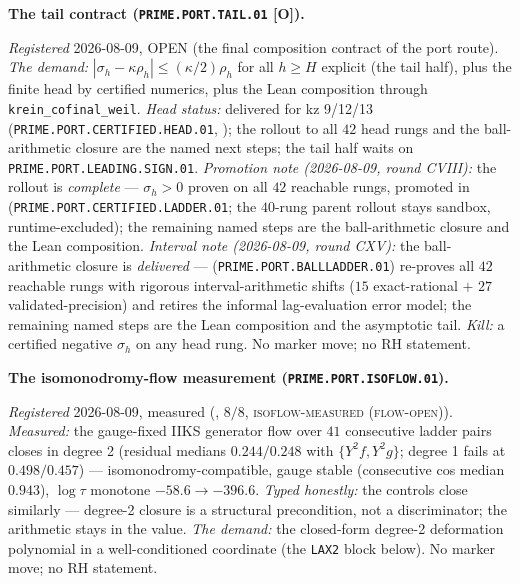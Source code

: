 \par\smallskip\noindent\textbf{The tail contract
(\texttt{PRIME.PORT.\allowbreak TAIL.01} [O]).}
{\sloppy
\emph{Registered} 2026-08-09, OPEN (the final composition
contract of the port route).  \emph{The demand:} $|\sigma_h -
\kappa\rho_h| \le (\kappa/2)\rho_h$ for all $h \ge H$ explicit
(the tail half), plus the finite head by certified numerics,
plus the Lean composition through
\texttt{krein\_cofinal\_weil}.  \emph{Head status:} delivered
for kz 9/12/13 (\texttt{PRIME.PORT.CERTIFIED.HEAD.01},
); the rollout to all
$42$ head rungs and the ball-arithmetic closure are the named
next steps; the tail half waits on
\texttt{PRIME.PORT.LEADING.SIGN.01}.  \emph{Promotion note
(2026-08-09, round CVIII):} the rollout is \emph{complete} ---
$\sigma_h > 0$ proven on all $42$ reachable rungs, promoted in
(\texttt{PRIME.PORT.CERTIFIED.LADDER.01}; the $40$-rung parent
rollout stays sandbox, runtime-excluded); the remaining named
steps are the ball-arithmetic closure and the Lean composition.
\emph{Interval note (2026-08-09, round CXV):} the
ball-arithmetic closure is \emph{delivered} ---
(\texttt{PRIME.PORT.BALLLADDER.01}) re-proves all $42$ reachable
rungs with rigorous interval-arithmetic shifts ($15$
exact-rational $+$ $27$ validated-precision) and retires the
informal lag-evaluation error model; the remaining named steps
are the Lean composition and the asymptotic tail.
\emph{Kill:} a certified
negative $\sigma_h$ on any head rung.  No marker move; no RH
statement.\par}


\par\smallskip\noindent\textbf{The isomonodromy-flow measurement
(\texttt{PRIME.PORT.\allowbreak ISOFLOW.01}).}
{\sloppy
\emph{Registered} 2026-08-09, measured
(, $8/8$,
\textsc{isoflow-measured (flow-open)}).  \emph{Measured:} the
gauge-fixed IIKS generator flow over $41$ consecutive ladder
pairs closes in degree 2 (residual medians $0.244/0.248$ with
$\{Y^2 f, Y^2 g\}$; degree 1 fails at $0.498/0.457$) ---
isomonodromy-compatible, gauge stable (consecutive cos median
$0.943$), $\log\tau$ monotone $-58.6 \to -396.6$.  \emph{Typed
honestly:} the controls close similarly --- degree-2 closure is
a structural precondition, not a discriminator; the arithmetic
stays in the value.  \emph{The demand:} the closed-form degree-2
deformation polynomial in a well-conditioned coordinate (the
\texttt{LAX2} block below).  No marker move; no RH
statement.\par}


